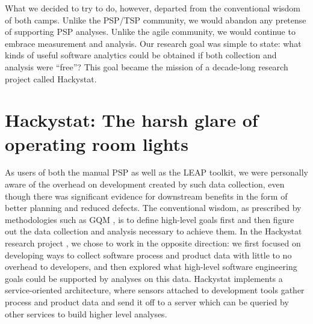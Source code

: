 \documentclass[]{article}
\begin{document}
What we decided to try to do, however, departed from the conventional wisdom of both
camps. Unlike the PSP/TSP community, we would abandon any pretense of supporting PSP
analyses.  Unlike the agile community, we would continue to embrace measurement and
analysis.  Our research goal was simple to state: what kinds of useful software analytics
could be obtained if both collection and analysis were ``free''?  This goal became the
mission of a decade-long research project called Hackystat. 

\section{Hackystat:  The harsh glare of operating room lights}

As users of both the manual PSP as well as the LEAP toolkit, we were personally aware of
the overhead on development created by such data collection, even though there was
significant evidence for downstream benefits in the form of better planning and reduced
defects. The conventional wisdom, as prescribed by methodologies such as GQM
\cite{Basili94gqm}, is to define high-level goals first and then figure out the data
collection and analysis necessary to achieve them.  In the Hackystat research project
\cite{csdl2-02-07}, we chose to work in the opposite direction: we first focused on
developing ways to collect software process and product data with little to no overhead to
developers, and then explored what high-level software engineering goals could be
supported by analyses on this data. Hackystat implements a service-oriented architecture,
where sensors attached to development tools gather process and product data and send it
off to a server which can be queried by other services to build higher level analyses. 
\end{document}
